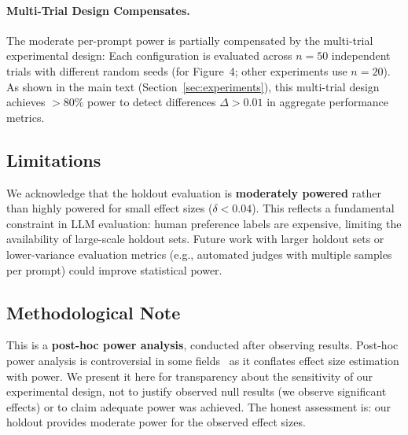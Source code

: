 \paragraph{Multi-Trial Design Compensates.} The moderate per-prompt power is partially compensated by the multi-trial experimental design: Each configuration is evaluated across $n=50$ independent trials with different random seeds (for Figure~4; other experiments use $n=20$). As shown in the main text (Section~\ref{sec:experiments}), this multi-trial design achieves $>80\%$ power to detect differences $\Delta > 0.01$ in aggregate performance metrics.

\subsection{Limitations}

We acknowledge that the holdout evaluation is \textbf{moderately powered} rather than highly powered for small effect sizes ($\delta < 0.04$). This reflects a fundamental constraint in LLM evaluation: human preference labels are expensive, limiting the availability of large-scale holdout sets. Future work with larger holdout sets or lower-variance evaluation metrics (e.g., automated judges with multiple samples per prompt) could improve statistical power.

\subsection{Methodological Note}

This is a \textbf{post-hoc power analysis}, conducted after observing results. Post-hoc power analysis is controversial in some fields~\cite{hoenig2001abuse} as it conflates effect size estimation with power. We present it here for transparency about the sensitivity of our experimental design, not to justify observed null results (we observe significant effects) or to claim adequate power was achieved. The honest assessment is: our holdout provides moderate power for the observed effect sizes.
